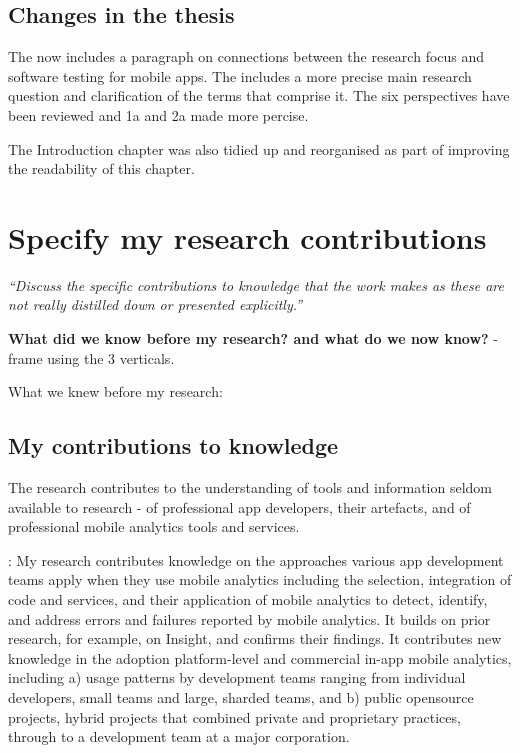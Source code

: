 \subsection{Changes in the thesis}
The  now includes a paragraph on connections between the research 
focus and software testing for  mobile apps. The  includes a more precise main research question and clarification of the terms that comprise it. The six perspectives have been reviewed and 1a and 2a made more percise.

The Introduction chapter was also tidied up and reorganised as part of improving the readability of this chapter.


\section{Specify my research contributions}
\emph{``Discuss the specific contributions to knowledge that the work makes as these are not really distilled down or presented explicitly.''}

\textbf{What did we know before my research? and what do we now know?} - frame using the 3 verticals.

What we knew before my research:


\subsection{My contributions to knowledge}
The research contributes to the understanding of tools and information seldom available to research - of professional app developers, their artefacts, and of professional mobile analytics tools and services. 

: 
My research contributes knowledge on the approaches various app development teams apply when they use mobile analytics including the selection, integration of code and services, and their application of mobile analytics to detect, identify, and address errors and failures reported by mobile analytics. It builds on prior research, for example, on Insight, and confirms their findings. It contributes new knowledge in the adoption platform-level and commercial in-app mobile analytics, including a) usage patterns by development teams ranging from individual  developers, small teams and large,  sharded teams, and b) public opensource projects, hybrid projects that combined private and proprietary practices, through to a development team at a major corporation.

